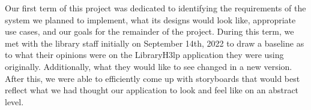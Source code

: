 Our first term of this project was dedicated to identifying the requirements of the system we planned to implement, what its designs would look like, appropriate use cases, and our goals for the remainder of the project. During this term, we met with the library staff initially on September 14th, 2022 to draw a baseline as to what their opinions were on the LibraryH3lp application they were using originally. Additionally, what they would like to see changed in a new version. After this, we were able to efficiently come up with storyboards that would best reflect what we had thought our application to look and feel like on an abstract level. 
